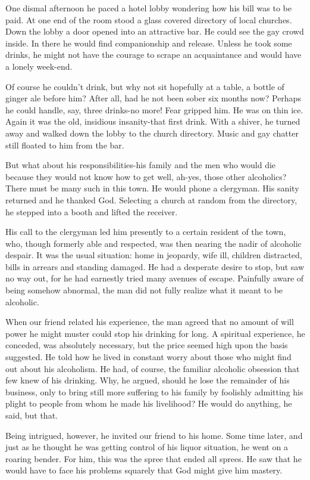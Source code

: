 \begin{biblechapter}
One dismal afternoon he paced a hotel lobby wondering how his bill was to be paid.  At one end of the room stood a glass covered directory of local churches.  Down the lobby a door opened into an attractive bar.  He could see the gay crowd inside.  In there he would find companionship and release.  Unless he took some drinks, he might not have the courage to scrape an acquaintance and would have a lonely week-end.

Of course he couldn't drink, but why not sit hopefully at a table, a bottle of ginger ale before him?  After all, had he not been sober six months now?  Perhaps he could handle, say, three drinks-no more!  Fear gripped him.  He was on thin ice.  Again it was the old, insidious insanity-that first drink.  With a shiver, he turned away and walked down the lobby to the church directory.  Music and gay chatter still floated to him from the bar.

But what about his responsibilities-his family and the men who would die because they would not know how to get well, ah-yes, those other alcoholics?  There must be many such in this town.  He would phone a clergyman.  His sanity returned and he thanked God.  Selecting a church at random from the directory, he stepped into a booth and lifted the receiver.

His call to the clergyman led him presently to a certain resident of the town, who, though formerly able and respected, was then nearing the nadir of alcoholic despair.  It was the usual situation: home in jeopardy, wife ill, children distracted, bills in arrears and standing damaged.  He had a desperate desire to stop, but saw no way out, for he had earnestly tried many avenues of escape.  Painfully aware of being somehow abnormal, the man did not fully realize what it meant to be alcoholic.

When our friend related his experience, the man agreed that no amount of will power he might muster could stop his drinking for long.  A spiritual experience, he conceded, was absolutely necessary, but the price seemed high upon the basis suggested.  He told how he lived in constant worry about those who might find out about his alcoholism.  He had, of course, the familiar alcoholic obsession that few knew of his drinking.  Why, he argued, should he lose the remainder of his business, only to bring still more suffering to his family by foolishly admitting his plight to people from whom he made his livelihood?  He would do anything, he said, but that.

Being intrigued, however, he invited our friend to his home.  Some time later, and just as he thought  he was getting control of his liquor situation, he went on a roaring bender.  For him, this was the spree that ended all sprees.  He saw that he would have to face his problems squarely that God might give him mastery.


\end{biblechapter}
